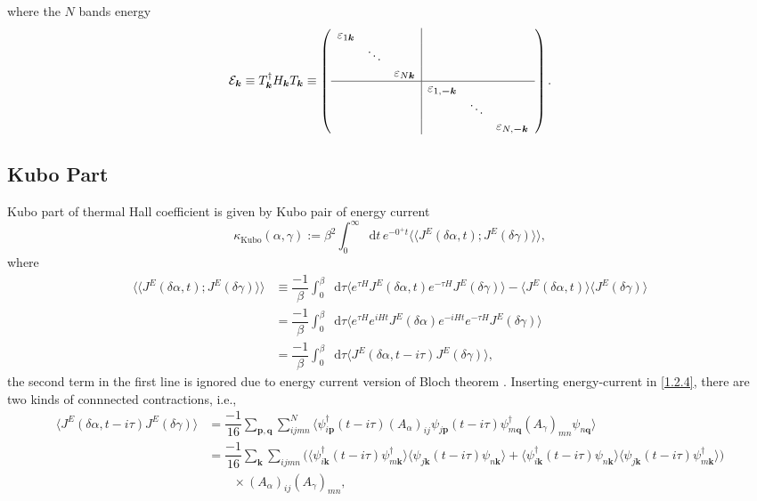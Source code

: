 \documentclass[10pt,nofootinbib]{revtex4}
\newcommand*\dd{\mathop{}\!\mathrm{d}}
\begin{document}
		where the $N$ bands energy
		\begin{equation*}
			\mathcal{E}_{\bm{k}}\equiv T_{\bm{k}}^\dagger H_{\bm{k}}T_{\bm{k}}\equiv \left(\begin{array}{ccc|ccc}
				\varepsilon_{1\bm{k}}&&&&&\\&\ddots&&&&\\&&\varepsilon_{N\bm{k}}&&&\\
				\hline
				&&&\varepsilon_{1,\bm{-k}}&&\\&&&&\ddots&\\&&&&&\varepsilon_{N,\bm{-k}}
			\end{array}\right).
		\end{equation*}
	\subsection{Kubo Part}
		Kubo part of thermal Hall coefficient is given by Kubo pair of energy current \cite{kubo2012statistical}
		\begin{equation}\label{1.4.1}
			\kappa_{\text{Kubo}}(\alpha,\gamma):=\beta^2\int_0^\infty\dd t\,e^{-0^+t}\langle \langle J^E(\delta\alpha,t);J^E(\delta\gamma)\rangle \rangle,
		\end{equation}
		where
		\begin{align}
			\langle \langle J^E(\delta\alpha,t);J^E(\delta\gamma)\rangle \rangle &\equiv\dfrac{-1}{\beta}\int_0^\beta\dd\tau \langle e^{\tau H}J^E(\delta\alpha,t)e^{-\tau H}J^E(\delta\gamma)\rangle- \langle J^E(\delta\alpha,t)\rangle\langle J^E(\delta\gamma)\rangle\nonumber\\
			&=\dfrac{-1}{\beta}\int_0^\beta\dd\tau \langle e^{\tau H}e^{iHt}J^E(\delta\alpha)e^{-iHt}e^{-\tau H}J^E(\delta\gamma)\rangle\nonumber\\
			&=\dfrac{-1}{\beta}\int_0^\beta\dd\tau \langle J^E(\delta\alpha,t-i\tau)J^E(\delta\gamma)\rangle,\label{1.4.2}
		\end{align}
		the second term in the first line is ignored due to energy current version of Bloch theorem \cite{watanabe2019proof,kapustin2019absence}. Inserting energy-current in \eqref{1.2.4}, there are two kinds of connnected contractions, i.e.,
		\begin{align}
			\langle J^E(\delta\alpha,t-i\tau)J^E(\delta\gamma)\rangle&=\dfrac{-1}{16}\sum_{\bm{p},\bm{q}}\sum_{ijmn}^N\bigg\langle\psi_{i\bm{p}}^\dagger(t-i\tau)(A_\alpha)_{ij}\psi_{j\bm{p}}(t-i\tau)\psi_{m\bm{q}}^\dagger(A_\gamma)_{mn}\psi_{n\bm{q}}\bigg\rangle\nonumber\\
			&=\dfrac{-1}{16}\sum_{\bm{k}}\sum_{ijmn}\bigg(\langle\psi_{i\bm{k}}^\dagger(t-i\tau)\psi_{m\bm{k}}^\dagger\rangle \langle\psi_{j\bm{k}}(t-i\tau)\psi_{n\bm{k}}\rangle+\langle\psi_{i\bm{k}}^\dagger(t-i\tau)\psi_{n\bm{k}}\rangle\langle\psi_{j\bm{k}}(t-i\tau)\psi_{m\bm{k}}^\dagger\rangle\bigg)\nonumber\\
			&\qquad\times(A_\alpha)_{ij}(A_\gamma)_{mn},\label{1.4.3}
		\end{align}
\end{document}
